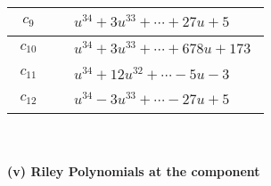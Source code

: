 \documentclass[1p]{elsarticle_modified}
\theoremstyle{definition}
\begin{document}
\begin{tabular}{m{50pt}|m{274pt}}
\hline $$\begin{aligned}c_{9}\end{aligned}$$&$\begin{aligned}
&u^{34}+3 u^{33}+\cdots+27 u+5
\end{aligned}$\\
\hline $$\begin{aligned}c_{10}\end{aligned}$$&$\begin{aligned}
&u^{34}+3 u^{33}+\cdots+678 u+173
\end{aligned}$\\
\hline $$\begin{aligned}c_{11}\end{aligned}$$&$\begin{aligned}
&u^{34}+12 u^{32}+\cdots-5 u-3
\end{aligned}$\\
\hline $$\begin{aligned}c_{12}\end{aligned}$$&$\begin{aligned}
&u^{34}-3 u^{33}+\cdots-27 u+5
\end{aligned}$\\
\hline
\end{tabular}\\~\\
\newpage\renewcommand{\arraystretch}{1}
\flushleft \textbf{(v) Riley Polynomials at the component}\newline \\
\end{document}
